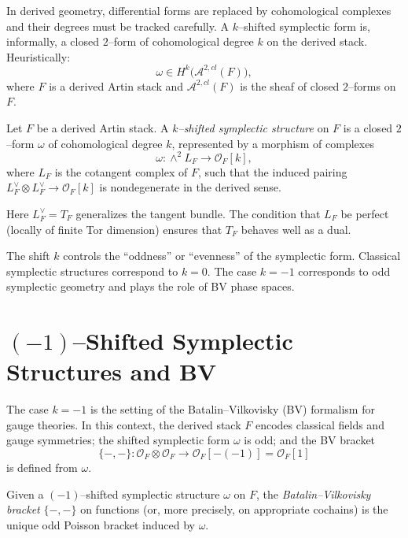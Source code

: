 In derived geometry, differential forms are replaced by cohomological complexes
and their degrees must be tracked carefully. A $k$--shifted symplectic form is,
informally, a closed $2$--form of cohomological degree $k$ on the derived
stack. Heuristically:
\[
  \omega \in H^{k}\big(\mathcal{A}^{2,cl}(F)\big),
\]
where $F$ is a derived Artin stack and $\mathcal{A}^{2,cl}(F)$ is the sheaf of
closed $2$--forms on $F$.

\begin{definition}
Let $F$ be a derived Artin stack. A \emph{$k$--shifted symplectic structure} on
$F$ is a closed $2$--form $\omega$ of cohomological degree $k$, represented by
a morphism of complexes
\[
  \omega: \wedge^2 L_F \longrightarrow \mathcal{O}_F[k],
\]
where $L_F$ is the cotangent complex of $F$, such that the induced pairing
$L_F^\vee \otimes L_F^\vee \to \mathcal{O}_F[k]$ is nondegenerate in the
derived sense.
\end{definition}

Here $L_F^\vee = T_F$ generalizes the tangent bundle. The condition that $L_F$
be perfect (locally of finite Tor dimension) ensures that $T_F$ behaves well as
a dual.

\Intuition
The shift $k$ controls the ``oddness'' or ``evenness'' of the symplectic form.
Classical symplectic structures correspond to $k=0$. The case $k=-1$
corresponds to odd symplectic geometry and plays the role of BV phase spaces.

\section{$(-1)$--Shifted Symplectic Structures and BV}

The case $k=-1$ is the setting of the Batalin–Vilkovisky (BV) formalism for
gauge theories. In this context, the derived stack $F$ encodes classical fields
and gauge symmetries; the shifted symplectic form $\omega$ is odd; and the BV
bracket
\[
  \{-,-\}: \mathcal{O}_F \otimes \mathcal{O}_F \to \mathcal{O}_F[-(-1)] = \mathcal{O}_F[1]
\]
is defined from $\omega$.

\begin{definition}
Given a $(-1)$--shifted symplectic structure $\omega$ on $F$, the
\emph{Batalin–Vilkovisky bracket} $\{-,-\}$ on functions (or, more precisely,
on appropriate cochains) is the unique odd Poisson bracket induced by $\omega$.
\end{definition}

